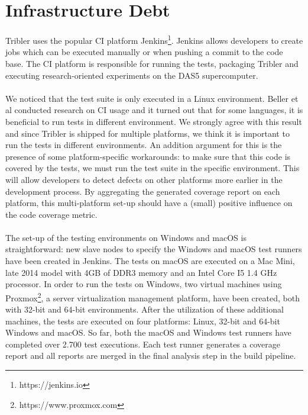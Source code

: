 \section{Infrastructure Debt}
Tribler uses the popular CI platform Jenkins\footnote{https://jenkins.io}. Jenkins allows developers to create jobs which can be executed manually or when pushing a commit to the code base. The CI platform is responsible for running the tests, packaging Tribler and executing research-oriented experiments on the DAS5 supercomputer.\\\\
We noticed that the test suite is only executed in a Linux environment. Beller et al\cite{beller2016oops} conducted research on CI usage and it turned out that for some languages, it is beneficial to run tests in different environment. We strongly agree with this result and since Tribler is shipped for multiple platforms, we think it is important to run the tests in different environments. An addition argument for this is the presence of some platform-specific workarounds: to make sure that this code is covered by the tests, we must run the test suite in the specific environment. This will allow developers to detect defects on other platforms more earlier in the development process. By aggregating the generated coverage report on each platform, this multi-platform set-up should have a (small) positive influence on the code coverage metric.\\\\
The set-up of the testing environments on Windows and macOS is straightforward: new slave nodes to specify the Windows and macOS test runners have been created in Jenkins. The tests on macOS are executed on a Mac Mini, late 2014 model with 4GB of DDR3 memory and an Intel Core I5 1.4 GHz processor. In order to run the tests on Windows, two virtual machines using Proxmox\footnote{https://www.proxmox.com}, a server virtualization management platform, have been created, both with 32-bit and 64-bit environments. After the utilization of these additional machines, the tests are executed on four platforms: Linux, 32-bit and 64-bit Windows and macOS. So far, both the macOS and Windows test runners have completed over 2.700 test executions. Each test runner generates a coverage report and all reports are merged in the final analysis step in the build pipeline.


